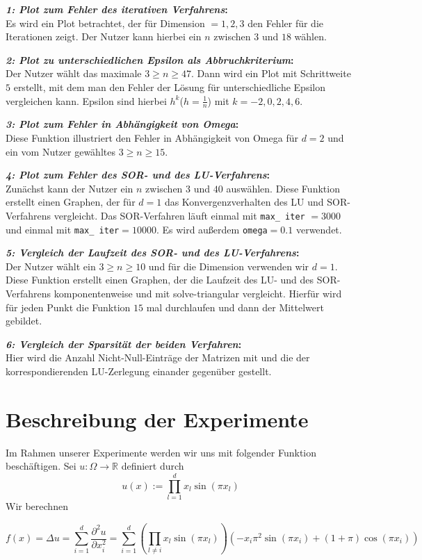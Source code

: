 \documentclass[smallheadings]{scrartcl}
\theoremstyle{definition}
\newcommand{\bfpara}[1]{
	
	\noindent \textbf{#1:}\,}
\begin{document}
 \bfpara{\textit{1: Plot zum Fehler des iterativen Verfahrens}}\\
 Es wird ein Plot betrachtet, der für Dimension $=1,2,3$ den Fehler für die Iterationen zeigt. Der Nutzer
 kann hierbei ein $n$ zwischen $3$ und $18$ wählen.
 \bfpara{\textit{2: Plot zu unterschiedlichen Epsilon als Abbruchkriterium}}\\
 Der Nutzer wählt das maximale $3\geq n\geq 47$. Dann wird ein Plot mit Schrittweite $5$
 erstellt, mit dem man den Fehler der Lösung für unterschiedliche Epsilon vergleichen kann.
 Epsilon sind hierbei $h^k$($h=\frac{1}{n}$) mit $k=-2,0,2,4,6$.
 \bfpara{\textit{3: Plot zum Fehler in Abhängigkeit von Omega}}\\
 Diese Funktion illustriert den Fehler in Abhängigkeit von Omega für $d=2$ und ein vom Nutzer gewähltes
 $3\geq n\geq 15$.
 \bfpara{\textit{4: Plot zum Fehler des SOR- und des LU-Verfahrens}}\\
 Zunächst kann der Nutzer ein $n$ zwischen $3$ und $40$ auswählen.
 Diese Funktion erstellt einen Graphen, der für $d=1$ das Konvergenzverhalten
 des LU und SOR-Verfahrens vergleicht. Das SOR-Verfahren läuft
 einmal mit \texttt{max\_ iter} $=3000$ und einmal mit \texttt{max\_ iter}$=10000$. Es wird außerdem \texttt{omega}$=0.1$ verwendet.
 \bfpara{\textit{5: Vergleich der Laufzeit des SOR- und des LU-Verfahrens}}\\
     Der Nutzer wählt ein $3\geq n\geq 10$ und für die Dimension verwenden wir $d=1$.
     Diese Funktion erstellt einen Graphen, der die Laufzeit des
     LU- und des SOR-Verfahrens komponentenweise und mit
     solve-triangular vergleicht. Hierfür wird für jeden Punkt die Funktion $15$ mal durchlaufen und dann der Mittelwert gebildet.
 \bfpara{\textit{6: Vergleich der Sparsität der beiden Verfahren}}\\
 Hier wird die Anzahl Nicht-Null-Einträge der Matrizen mit und die der korrespondierenden LU-Zerlegung einander gegenüber gestellt.

\section{Beschreibung der Experimente}

 \cbstart Im Rahmen unserer Experimente werden wir uns mit folgender Funktion beschäftigen.
Sei $u:\Omega\rightarrow \mathbb{R}$ definiert durch
$$u(x):=\prod_{l=1}^dx_l\sin (\pi x_l)$$
Wir berechnen

$$f(x)=\Delta u= \sum_{i=1}^d\frac{\partial ^2 u}{\partial x_i^2}=
 \sum_{i=1}^d \left(\prod_{l\neq i}x_l\sin (\pi x_l)\right)\left(-x_i\pi ^2\sin (\pi x_i)+(1+\pi)\cos (\pi x_i) \right)$$
\end{document}
